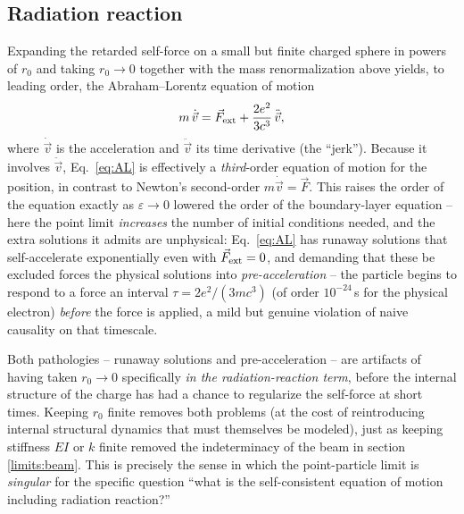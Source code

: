 \subsection{Radiation reaction}

Expanding the retarded self-force on a small but finite charged sphere in
powers of $r_0$ and taking $r_0\to0$ together with the mass renormalization
above yields, to leading order, the Abraham--Lorentz equation of motion
\begin{equation}
m\,\dot{\vec v} = \vec F_{\rm ext} + \frac{2e^2}{3c^3}\,\ddot{\vec v},
\label{eq:AL}
\end{equation}
where $\dot{\vec v}$ is the acceleration and $\ddot{\vec v}$ its
time derivative (the ``jerk''). Because it involves $\ddot{\vec
v}$, Eq.~\eqref{eq:AL} is effectively a \emph{third}-order
equation of motion for the position, in contrast to Newton's
second-order $m\dot{\vec v}=\vec F$. This raises the order of the
equation exactly as $\varepsilon\to0$ lowered the order of the
boundary-layer equation -- here the point limit
\emph{increases} the number of initial conditions needed, and
the extra solutions it admits are unphysical: Eq.~\eqref{eq:AL}
has runaway solutions that self-accelerate exponentially even
with $\vec F_{\rm ext}=0$, and demanding that these be excluded
forces the physical solutions into \emph{pre-acceleration} --
the particle begins to respond to a force an interval
$\tau=2e^2/(3mc^3)$ (of order $10^{-24}\,$s for the physical
electron) \emph{before} the force is applied, a mild but genuine
violation of naive causality on that timescale.

Both pathologies -- runaway solutions and pre-acceleration --
are artifacts of having taken $r_0\to0$ specifically \emph{in
the radiation-reaction term}, before the internal structure of
the charge has had a chance to regularize the self-force at
short times. Keeping $r_0$ finite removes both problems (at the
cost of reintroducing internal structural dynamics that must
themselves be modeled), just as keeping stiffness $EI$ or $k$ finite
removed the indeterminacy of the beam in section \ref{limits:beam}.
This is precisely the
sense in which the point-particle limit is \emph{singular} for
the specific question ``what is the self-consistent equation of
motion including radiation reaction?''

